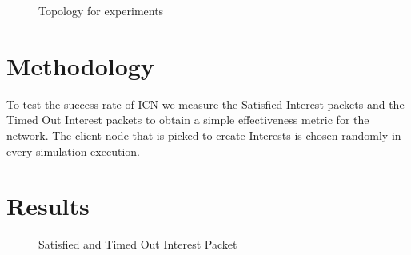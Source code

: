 \documentclass[8pt,twocolumn]{article}
\begin{document}
\begin{figure}[h]
\centering
{}
\caption{Topology for experiments}
\label{fig:exptop}
\end{figure}

\section{Methodology}
To test the success rate of ICN we measure the Satisfied Interest packets and
the Timed Out Interest packets to obtain a simple effectiveness metric for the 
network.  
The client node that is picked to create Interests is chosen randomly in every
 simulation execution.



\section{Results}

\begin{figure}[h]
\centering
{}
\caption{Satisfied and Timed Out Interest Packet}
\label{fig:sattimeint}
\end{figure}
\end{document}
